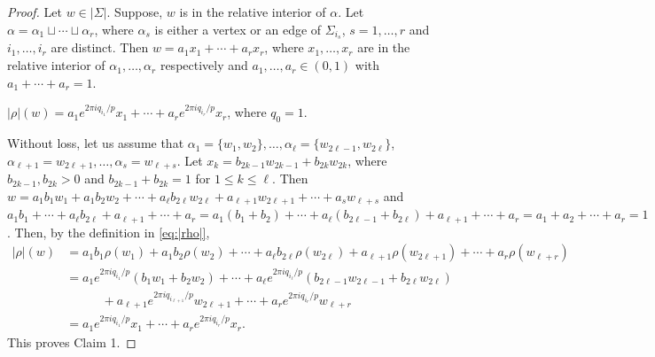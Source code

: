 \documentclass[12pt]{article}
\theoremstyle{theorem}
\theoremstyle{definition}
\begin{document}
\begin{proof}
Let $w\in |\Sigma|$. Suppose, $w$ is in the relative interior of $\alpha$. Let $\alpha = \alpha_1 \sqcup\cdots \sqcup \alpha_r$, where $\alpha_s$ is either a vertex or an edge of $\Sigma_{i_s}$, $s=1, \dots, r$ and $i_1, \dots, i_r$ are distinct. Then $w= a_1x_1+\cdots + a_rx_r$, where $x_1, \dots, x_r$ are in the relative interior of $\alpha_1, \dots, \alpha_r$ respectively and $a_1, \dots, a_r\in (0, 1)$ with $a_1+\cdots+a_r=1$.  

\medskip 

 $|\rho|(w) = a_1e^{2\pi iq_{i_1}/p} x_1+ \cdots + a_re^{2\pi iq_{i_r}/p}x_r$, where $q_0=1$. 

\medskip

Without loss, let us assume that $\alpha_1 = \{w_1, w_2\}, \dots, \alpha_{\ell} = \{w_{2\ell - 1}, w_{2\ell}\}$, $\alpha_{\ell+1}= w_{2\ell+1}, \dots, \alpha_{s} = w_{\ell+s}$. Let $x_k = b_{2k-1}w_{2k-1}+ b_{2k}w_{2k}$, where $b_{2k-1}, b_{2k}>0$ and $b_{2k-1}+ b_{2k} =1$ for $1\leq k\leq\ell$. Then $w= a_1b_1w_1 + a_1b_2w_2 + \cdots + a_{\ell}b_{2\ell}w_{2\ell}+ a_{\ell+1}w_{2\ell+1} + \cdots+ a_sw_{\ell+s}$ and $a_1b_1 + \cdots + a_{\ell}b_{2\ell}+ a_{\ell+1} + \cdots+ a_r = a_1(b_1+b_2) + \cdots + a_{\ell}(b_{2\ell-1}+b_{2\ell}) + a_{\ell+1} + \cdots+ a_r = a_1+a_2+\cdots +a_r =1$.  Then, by the definition in \eqref{eq:|rho|}, 
\begin{align*}
|\rho| (w)  &= a_1b_1\rho(w_1) + a_1b_2\rho(w_2) + \cdots + a_{\ell}b_{2\ell}\rho(w_{2\ell}) + a_{\ell+1}\rho(w_{2\ell+1}) + \cdots+ a_r\rho(w_{\ell+r}) \\
& = a_1e^{2\pi iq_{i_1}/p}(b_1w_1 + b_2w_2) + \cdots +  a_{\ell}e^{2\pi iq_{i_{\ell}}/p}(b_{2\ell-1}w_{2\ell-1} +b_{2\ell}w_{2\ell}) \\
& ~~~~ \qquad + a_{\ell+1}e^{2\pi iq_{i_{\ell+1}}/p}w_{2\ell+1}  + \cdots+ a_re^{2\pi iq_{i_{r}}/p}w_{\ell+r} \\
& = a_1e^{2\pi iq_{i_1}/p} x_1+ \cdots + a_re^{2\pi iq_{i_r}/p}x_r. 
\end{align*}
This proves Claim 1. 

\smallskip


\end{proof}
\end{document}
